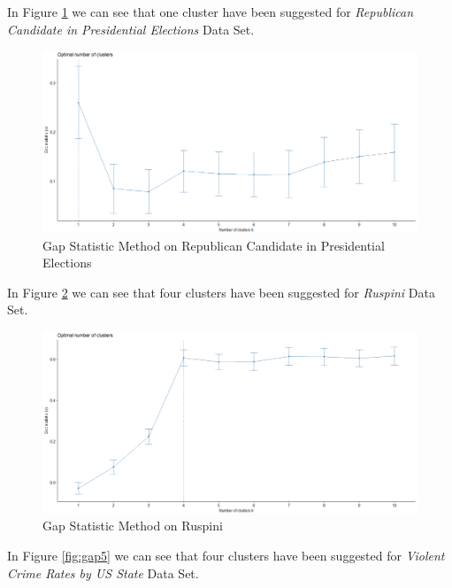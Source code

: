 \begin{itemize}
\vspace{15mm}

In Figure \ref{fig:gap3} we can see that one cluster have been suggested for \textit{Republican Candidate in Presidential Elections} Data Set.

\begin{figure}[h!]
  \centering
  \includegraphics[scale=1.3]{figures/results/republican/gap.png}
  \caption{Gap Statistic Method on Republican Candidate in Presidential Elections}
  \label{fig:gap3}
\end{figure}

\newpage

In Figure \ref{fig:gap4} we can see that four clusters have been suggested for \textit{Ruspini} Data Set.

\begin{figure}[h!]
  \centering
  \includegraphics[scale=1.3]{figures/results/ruspini/gap.png}
  \caption{Gap Statistic Method on Ruspini}
  \label{fig:gap4}
\end{figure}

\vspace{15mm}

In Figure \ref{fig:gap5} we can see that four clusters have been suggested for \textit{Violent Crime Rates by US State} Data Set.


\end{itemize}
